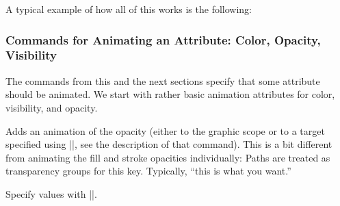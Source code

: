 A typical example of how all of this works is the following:
\begin{codeexample}
{
  \pgfsys@animation@whom{\someid}{}%
  \pgfsys@animatefillopacity%
}
{
  \pgfsys@animation@whom{\someid}{}%
  \pgfsys@animatelinewidth%
}
\end{codeexample}


\subsubsection{Commands for Animating an Attribute: Color, Opacity, Visibility}

The commands from this and the next sections specify that some
attribute should be animated. We start with rather basic animation
attributes for color, visibility, and opacity.

\begin{command}{\pgfsys@animateopacity}
  Adds an animation of the opacity (either to the graphic scope or to
  a target specified using |\string\pgfsys@animation@whom|, see the
  description of that command). This is a bit different from animating
  the fill and stroke opacities  individually: Paths are treated as
  transparency groups for this key. Typically, ``this is what you
  want.''
  
  Specify values with |\pgfsys@animation@scalar|.

\begin{codeexample}[width=2cm]
\end{codeexample}
\end{command}

